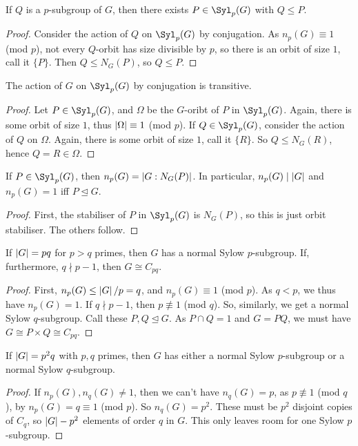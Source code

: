 \documentclass{article}
\begin{document}
\begin{theorem}[Sylow 3]
    If $Q$ is a $p$-subgroup of $G$, then there exists $P\in \Syl_p(G)$ with $Q\leq P$.
    \begin{proof}
        Consider the action of $Q$ on $\Syl_p(G)$ by conjugation. As $n_p(G)\equiv 1$ (mod $p$), not every $Q$-orbit has size divisible by $p$, so there is an orbit of size $1$, call it $\{P\}$. Then $Q\leq N_G(P)$, so $Q\leq P$.
    \end{proof}
\end{theorem}

\begin{theorem}[Sylow 4]
    The action of $G$ on $\Syl_p(G)$ by conjugation is transitive.
    \begin{proof}
        Let $P\in \Syl_p(G)$, and $\Omega$ be the $G$-oribt of $P$ in $\Syl_p(G)$. Again, there is some orbit of size $1$, thus $\left| \Omega \right|\equiv 1$ (mod $p$). If $Q\in \Syl_p(G)$, consider the action of $Q$ on $\Omega$. Again, there is some orbit of size $1$, call it $\{R\}$. So $Q\leq N_G(R)$, hence $Q =R\in \Omega$.
    \end{proof}
\end{theorem}

\begin{corollary}
    If $P\in \Syl_p(G)$, then $n_p(G) = \left| G:N_G(P) \right|$. In particular, $n_p(G)\mid \left| G \right|$ and $n_p(G)=1$ iff $P\unlhd G$.
    \begin{proof}
        First, the stabiliser of $P$ in $\Syl_p(G)$ is $N_G(P)$, so this is just orbit stabiliser. The others follow.
    \end{proof}
\end{corollary}

\begin{proposition}
    If $\left| G \right| = pq$ for $p>q$ primes, then $G$ has a normal Sylow $p$-subgroup. If, furthermore, $q\nmid p-1$, then $G\cong C_{pq}$.
    \begin{proof}
        First, $n_p(G)\leq \left| G \right|/p=q$, and $n_p(G)\equiv 1$ (mod $p$). As $q<p$, we thus have $n_p(G)=1$. If $q\nmid p-1$, then $p\not\equiv 1$ (mod $q$). So, similarly, we get a normal Sylow $q$-subgroup. Call these $P,Q\unlhd G$. As $P\cap Q = 1$ and $G=PQ$, we must have $G\cong P\times Q \cong C_{pq}$.
    \end{proof}
\end{proposition}

\begin{proposition}
    If $\left| G \right|=p^2q$ with $p,q$ primes, then $G$ has either a normal Sylow $p$-subgroup or a normal Sylow $q$-subgroup.
    \begin{proof}
        If $n_p(G),n_q(G)\neq 1$, then we can't have $n_q(G)=p$, as $p\not\equiv 1$ (mod $q$), by $n_p(G)=q\equiv 1$ (mod $p$). So $n_q(G)=p^2$. These must be $p^2$ disjoint copies of $C_q$, so $\left| G \right|-p^2$ elements of order $q$ in $G$. This only leaves room for one Sylow $p$-subgroup.
    \end{proof}
\end{proposition}
\end{document}
